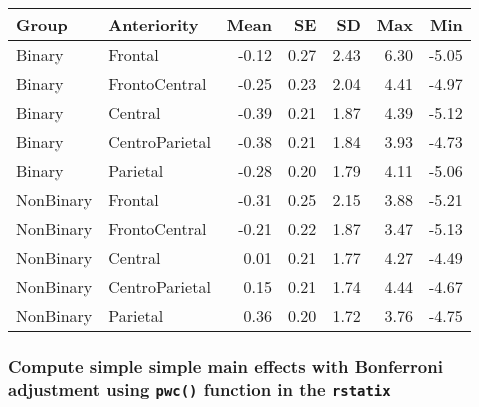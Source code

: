 \documentclass[
]{article}
\begin{document}
\begin{longtable}[]{@{}llrrrrr@{}}
\toprule\noalign{}
Group & Anteriority & Mean & SE & SD & Max & Min \\
\midrule\noalign{}
\endhead
\bottomrule\noalign{}
\endlastfoot
Binary & Frontal & -0.12 & 0.27 & 2.43 & 6.30 & -5.05 \\
Binary & FrontoCentral & -0.25 & 0.23 & 2.04 & 4.41 & -4.97 \\
Binary & Central & -0.39 & 0.21 & 1.87 & 4.39 & -5.12 \\
Binary & CentroParietal & -0.38 & 0.21 & 1.84 & 3.93 & -4.73 \\
Binary & Parietal & -0.28 & 0.20 & 1.79 & 4.11 & -5.06 \\
NonBinary & Frontal & -0.31 & 0.25 & 2.15 & 3.88 & -5.21 \\
NonBinary & FrontoCentral & -0.21 & 0.22 & 1.87 & 3.47 & -5.13 \\
NonBinary & Central & 0.01 & 0.21 & 1.77 & 4.27 & -4.49 \\
NonBinary & CentroParietal & 0.15 & 0.21 & 1.74 & 4.44 & -4.67 \\
NonBinary & Parietal & 0.36 & 0.20 & 1.72 & 3.76 & -4.75 \\
\end{longtable}

\subsubsection{\texorpdfstring{Compute simple simple main effects with
Bonferroni adjustment using \texttt{pwc()} function in the
\texttt{rstatix}}{Compute simple simple main effects with Bonferroni adjustment using pwc() function in the rstatix}}\label{compute-simple-simple-main-effects-with-bonferroni-adjustment-using-pwc-function-in-the-rstatix}
\end{document}
